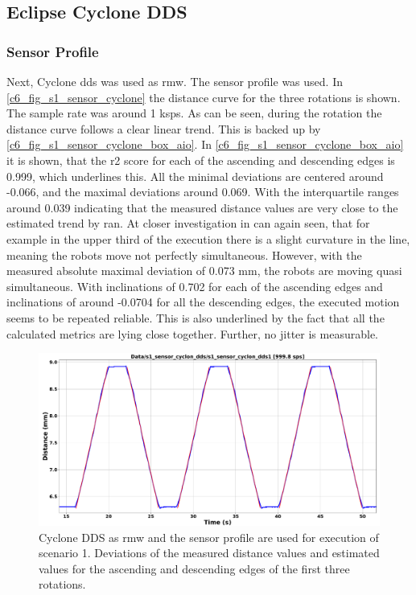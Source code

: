\subsection{Eclipse Cyclone DDS}
\subsubsection{Sensor Profile}
Next, Cyclone \gls{dds} was used as \gls{rmw}. The sensor profile was used. In \autoref{c6_fig_s1_sensor_cyclone} the distance curve for the three rotations is shown. The sample rate was around 1 ksps. As can be seen, during the rotation the distance curve follows a clear linear trend. This is backed up by \autoref{c6_fig_s1_sensor_cyclone_box_aio}. In \autoref{c6_fig_s1_sensor_cyclone_box_aio} it is shown, that the \gls{r2} score for each of the ascending and descending edges is 0.999, which underlines this. All the minimal deviations are centered around -0.066, and the maximal deviations around 0.069. With the interquartile ranges around 0.039 indicating that the measured distance values are very close to the estimated trend by \gls{ran}. At closer investigation in can again seen, that for example in the upper third of the execution there is a slight curvature in the line, meaning the robots move not perfectly simultaneous. However, with the measured absolute maximal deviation of 0.073 \si{\milli\meter}, the robots are moving quasi simultaneous.\newline
With inclinations of 0.702 for each of the ascending edges and inclinations of around -0.0704 for all the descending edges, the executed motion seems to be repeated reliable. This is also underlined by the fact that all the calculated metrics are lying close together. Further, no jitter is measurable. 
\begin{figure}[htbp]
	\centering
	\includegraphics[width=1\textwidth]{Figures/c6/s1/s1_sensor_cyclon_dds.pdf}
	\caption{Cyclone DDS as \gls{rmw} and the sensor profile are used for execution of scenario 1. Deviations of the measured distance values and estimated values for the ascending and descending edges of the first three rotations.}
	\label{c6_fig_s1_sensor_cyclone}
\end{figure}
